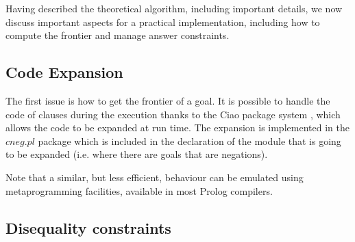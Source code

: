 \documentclass{llncs}
\begin{document}
Having described the theoretical algorithm, including important
details, we now discuss important aspects for a practical
implementation, including how to compute the frontier and manage
answer constraints.


\subsection{Code Expansion}
\label{expansion}

The first issue is how to get the frontier of a goal. It is possible
to handle the code of clauses during the execution thanks to the Ciao
package system \cite{ciao-modules-cl2000}, which allows the code to be
expanded at run time. The expansion is implemented in the $cneg.pl$
package which is included in the declaration of the module that is
going to be expanded (i.e. where there are goals that are negations).




Note that a similar, but less efficient, behaviour can be emulated
using metaprogramming facilities, available in most Prolog compilers.
 


\subsection{Disequality constraints}
\label{disequality}
\end{document}
